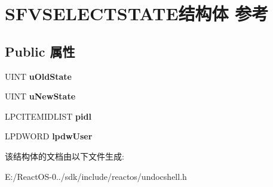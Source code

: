 \hypertarget{struct_s_f_v_s_e_l_e_c_t_s_t_a_t_e}{}\section{S\+F\+V\+S\+E\+L\+E\+C\+T\+S\+T\+A\+T\+E结构体 参考}
\label{struct_s_f_v_s_e_l_e_c_t_s_t_a_t_e}
\subsection*{Public 属性}
\begin{DoxyCompactItemize}
\item 
\mbox{\label{struct_s_f_v_s_e_l_e_c_t_s_t_a_t_e_a6bfa4103fe62b0cbbbba915a394518c7}} 
U\+I\+NT {\bfseries u\+Old\+State}
\item 
\mbox{\label{struct_s_f_v_s_e_l_e_c_t_s_t_a_t_e_acf9a3b921bf277691544f24fc8dac977}} 
U\+I\+NT {\bfseries u\+New\+State}
\item 
\mbox{\label{struct_s_f_v_s_e_l_e_c_t_s_t_a_t_e_a4533b24cfcf5a65a285269999b911398}} 
L\+P\+C\+I\+T\+E\+M\+I\+D\+L\+I\+ST {\bfseries pidl}
\item 
\mbox{\label{struct_s_f_v_s_e_l_e_c_t_s_t_a_t_e_aa9e07c2c5dd28aa7d4781a810c79b6b4}} 
L\+P\+D\+W\+O\+RD {\bfseries lpdw\+User}
\end{DoxyCompactItemize}


该结构体的文档由以下文件生成\+:\begin{DoxyCompactItemize}
\item 
E\+:/\+React\+O\+S-\/0../sdk/include/reactos/undocshell.\+h\end{DoxyCompactItemize}
